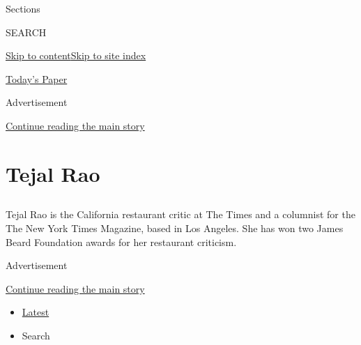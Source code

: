 Sections

SEARCH

\protect\hyperlink{site-content}{Skip to
content}\protect\hyperlink{site-index}{Skip to site index}

\href{https://myaccount.nytimes3xbfgragh.onion/auth/login?response_type=cookie\&client_id=vi}{}

\href{https://www.nytimes3xbfgragh.onion/section/todayspaper}{Today's
Paper}

Advertisement

\protect\hyperlink{after-top}{Continue reading the main story}

\hypertarget{tejal-rao}{%
\section{Tejal Rao}\label{tejal-rao}}

\subsection{}

Tejal Rao is the California restaurant critic at The Times and a
columnist for the The New York Times Magazine, based in Los Angeles. She
has won two James Beard Foundation awards for her restaurant criticism.

Advertisement

\protect\hyperlink{after-mid1}{Continue reading the main story}

\begin{itemize}
\tightlist
\item
  \protect\hyperlink{stream-panel}{Latest}
\item
  Search
\end{itemize}

